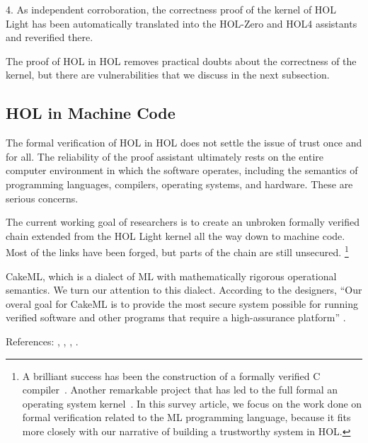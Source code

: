 \documentclass[brochure,english,12pt]{bourbaki}
\theoremstyle{plain}
\begin{document}
4.  As independent corroboration, the correctness proof of the kernel of HOL Light 
has been automatically translated into the HOL-Zero and HOL4 assistants
and reverified there.


The proof of HOL in HOL removes practical doubts about the correctness of the kernel, but there
are vulnerabilities that we discuss in the next subsection.



\subsection{HOL in Machine Code}

The formal verification of HOL in HOL does not settle the issue of trust once and for all.
The reliability of the proof assistant ultimately
rests on the entire computer environment in which the software operates, 
including the semantics of programming languages,
compilers, operating systems, and hardware.  These are serious concerns.


 The current working goal of researchers is to create an unbroken formally verified chain extended from the
HOL Light kernel all the way down to machine code.  Most of the links have been forged, but parts of the chain
are still unsecured.  
\footnote{A brilliant success has been the construction of a formally verified C compiler~\cite{CC}. Another remarkable
project that has led to the full formal an operating system kernel~\cite{sel4}.  In this survey article,
we focus on the work done on formal verification related to the ML programming language, because it fits more closely
with our narrative of building a trustworthy system in HOL.}

CakeML, which
is a dialect of ML with mathematically rigorous operational semantics.  We turn our
attention to this dialect.    According to the designers, ``Our overal goal for CakeML
is to provide the most secure system possible for running verified software and other programs that require a high-assurance
platform'' \cite{CakeML}.

References: \cite{CakeML}, \cite{VIH}, \cite{stateful-ML}, \cite{x86-CC}.
\end{document}
